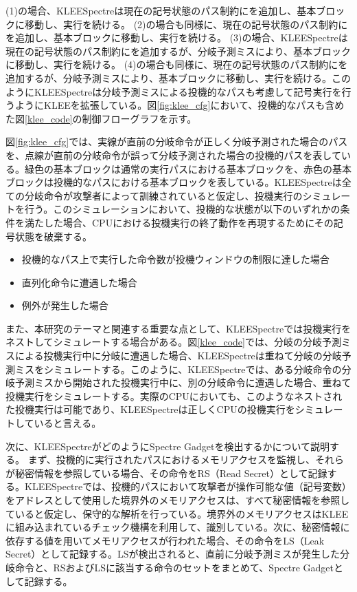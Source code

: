 (1)の場合、KLEESpectreは現在の記号状態のパス制約にを追加し、基本ブロックに移動し、実行を続ける。
(2)の場合も同様に、現在の記号状態のパス制約にを追加し、基本ブロックに移動し、実行を続ける。
(3)の場合、KLEESpectreは現在の記号状態のパス制約にを追加するが、分岐予測ミスにより、基本ブロックに移動し、実行を続ける。
(4)の場合も同様に、現在の記号状態のパス制約にを追加するが、分岐予測ミスにより、基本ブロックに移動し、実行を続ける。このようにKLEESpectreは分岐予測ミスによる投機的なパスも考慮して記号実行を行うようにKLEEを拡張している。図\ref{fig:klee_cfg}において、投機的なパスも含めた図\ref{klee_code}の制御フローグラフを示す。\par
図\ref{fig:klee_cfg}では、実線が直前の分岐命令が正しく分岐予測された場合のパスを、点線が直前の分岐命令が誤って分岐予測された場合の投機的パスを表している。緑色の基本ブロックは通常の実行パスにおける基本ブロックを、赤色の基本ブロックは投機的なパスにおける基本ブロックを表している。KLEESpectreは全ての分岐命令が攻撃者によって訓練されていると仮定し、投機実行のシミュレートを行う。このシミュレーションにおいて、投機的な状態が以下のいずれかの条件を満たした場合、CPUにおける投機実行の終了動作を再現するためにその記号状態を破棄する。\par
\begin{itemize}
  \item 投機的なパス上で実行した命令数が投機ウィンドウの制限に達した場合
  \item 直列化命令に遭遇した場合
  \item 例外が発生した場合
\end{itemize}

また、本研究のテーマと関連する重要な点として、KLEESpectreでは投機実行をネストしてシミュレートする場合がある。図\ref{klee_code}では、分岐の分岐予測ミスによる投機実行中に分岐に遭遇した場合、KLEESpectreは重ねて分岐の分岐予測ミスをシミュレートする。このように、KLEESpectreでは、ある分岐命令の分岐予測ミスから開始された投機実行中に、別の分岐命令に遭遇した場合、重ねて投機実行をシミュレートする。実際のCPUにおいても、このようなネストされた投機実行は可能であり\cite{mambretti2019speculator}、KLEESpectreは正しくCPUの投機実行をシミュレートしていると言える。\par
次に、KLEESpectreがどのようにSpectre Gadgetを検出するかについて説明する。
まず、投機的に実行されたパスにおけるメモリアクセスを監視し、それらが秘密情報を参照している場合、その命令をRS（Read Secret）として記録する。KLEESpectreでは、投機的パスにおいて攻撃者が操作可能な値（記号変数）をアドレスとして使用した境界外のメモリアクセスは、すべて秘密情報を参照していると仮定し、保守的な解析を行っている。境界外のメモリアクセスはKLEEに組み込まれているチェック機構を利用して、識別している。次に、秘密情報に依存する値を用いてメモリアクセスが行われた場合、その命令をLS（Leak Secret）として記録する。LSが検出されると、直前に分岐予測ミスが発生した分岐命令と、RSおよびLSに該当する命令のセットをまとめて、Spectre Gadgetとして記録する。\par

